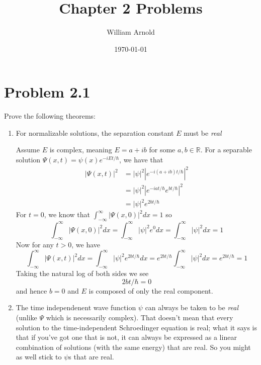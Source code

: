 \documentclass{article}
\title{Chapter 2 Problems}
\author{William Arnold}
\date\today
\newcommand{\intinf}{\int_{-\infty}^\infty}
\newenvironment{problem}{\begin{enumerate}[label=(\alph*)]}{\end{enumerate}}
\begin{document}
\maketitle 

\section{Problem 2.1}
  Prove the following theorems:
  \begin{problem}
    \item For normalizable solutions, the separation constant $E$ must be \textit{real}

      Assume $E$ is complex, meaning $E = a + ib$ for some $a,b \in \mathbb{R}$. For a separable solution $\Psi(x, t) = \psi(x) e^{-iEt/\hbar}$, we have that
      \begin{align*}
        |\Psi(x,t)|^2 &= |\psi|^2 \left|e^{-i(a+ib)t/\hbar}\right|^2 \\
                      &= |\psi|^2 \left|e^{-iat/\hbar} e^{bt/\hbar}\right|^2 \\
                      &= |\psi|^2 e^{2bt/\hbar}
      \end{align*}
      For $t=0$, we know that $\intinf |\Psi(x,0)|^2 dx = 1$ so
      $$ \intinf |\Psi(x,0)|^2 dx = \intinf |\psi|^2 e^0 dx = \intinf |\psi|^2 dx = 1$$
      Now for any $t > 0$, we have
      $$ \intinf |\Psi(x,t)|^2 dx = \intinf |\psi|^2 e^{2bt/\hbar} dx = e^{2bt/\hbar}\intinf |\psi|^2 dx = e^{2bt/\hbar} = 1$$
      Taking the natural log of both sides we see
      $$ 2bt/\hbar = 0 $$
      and hence $b = 0$ and $E$ is composed of only the real component.

    \item The time independenent wave function $\psi$ can always be taken to be \textit{real} (unlike $\Psi$ which is necessarily complex). 
      That doesn't mean that every solution to the time-independent Schroedinger equation is real; what it says is that if you've got one that is not, it can always be expressed as a linear combination of solutions (with the same energy) that are real. So you might as well stick to $\psi$s that are real.
      

\end{problem}
\end{document}
